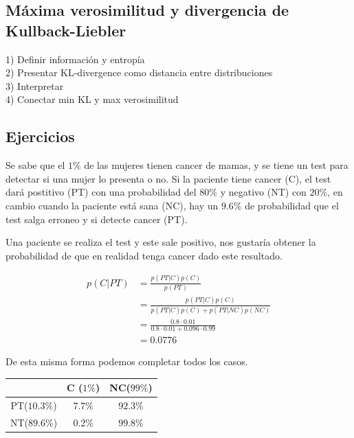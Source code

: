 \subsection{Máxima verosimilitud y divergencia de Kullback-Liebler}

\begin{mdframed}[style=pendiente, frametitle={\center Discusión}]
1) Definir información y entropía\\
2) Presentar KL-divergence como distancia entre distribuciones\\
3) Interpretar \\
4) Conectar min KL y max verosimilitud
	
\end{mdframed}








\subsection{Ejercicios} %
\label{sub:ejercicios_regresion_lineal}


Se sabe que el $1\%$ de las mujeres tienen cancer de mamas, y se tiene un test para detectar si una mujer lo presenta o no. Si la paciente tiene cancer (C), el test dará postitivo (PT) con una probabilidad del $80\%$ y negativo (NT) con $20\%$, en cambio cuando la paciente está sana (NC), hay un $9.6\%$ de probabilidad que el test salga erroneo y si detecte cancer (PT).

Una paciente se realiza el test y este sale positivo, nos gustaría obtener la probabilidad de que en realidad tenga cancer dado este resultado.

\begin{align}
	p(C|PT) & =\frac{p(PT|C)p(C)}{p(PT)} \\
			& = \frac{p(PT|C)p(C)}{p(PT|C)p(C)+p(PT|NC)p(NC)} \\
			& = \frac{0.8 \cdot 0.01}{0.8 \cdot 0.01 + 0.096 \cdot 0.99}\\
			& = 0.0776
\end{align}

De esta misma forma podemos completar todos los casos.
\\
{
\centering
\begin{tabular}{c|cc}
\toprule
   & C ($1\%$) &  NC($99\%$) \\\hline
PT($10.3\%$) & $7.7\%$ & $92.3\%$\\
NT($89.6$\%) & $0.2\%$ & $99.8\%$ \\
\bottomrule
\end{tabular}
}




